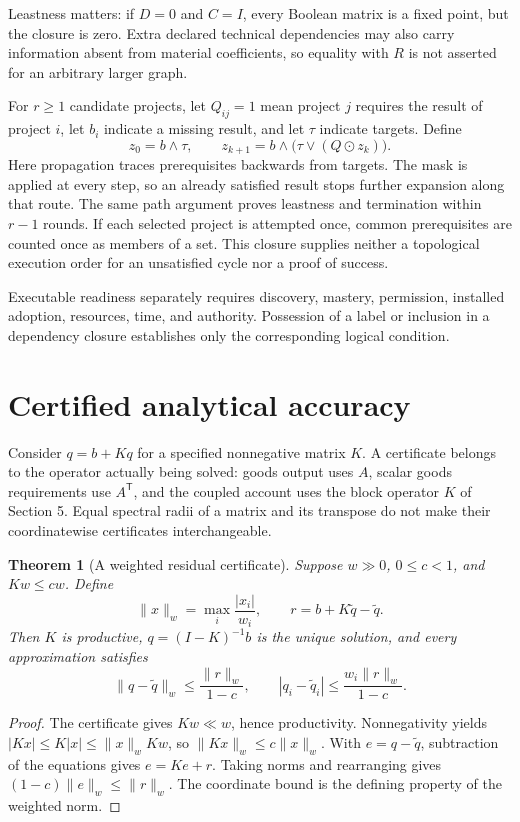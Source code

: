\documentclass[11pt,a4paper]{article}
\newtheorem{theorem}{Theorem}[section]
\begin{document}
Leastness matters: if $D=0$ and $C=I$, every Boolean matrix is a fixed point, but the closure is zero. Extra declared technical dependencies may also carry information absent from material coefficients, so equality with $R$ is not asserted for an arbitrary larger graph.

For $r\geq1$ candidate projects, let $Q_{ij}=1$ mean project $j$ requires the result of project $i$, let $b_i$ indicate a missing result, and let $\tau$ indicate targets. Define
\begin{equation}
z_0=b\wedge\tau,\qquad
z_{k+1}=b\wedge\bigl(\tau\vee(Q\odot z_k)\bigr).
\end{equation}
Here propagation traces prerequisites backwards from targets. The mask is applied at every step, so an already satisfied result stops further expansion along that route. The same path argument proves leastness and termination within $r-1$ rounds. If each selected project is attempted once, common prerequisites are counted once as members of a set. This closure supplies neither a topological execution order for an unsatisfied cycle nor a proof of success.

Executable readiness separately requires discovery, mastery, permission, installed adoption, resources, time, and authority. Possession of a label or inclusion in a dependency closure establishes only the corresponding logical condition.

\section{Certified analytical accuracy}
Consider $q=b+Kq$ for a specified nonnegative matrix $K$. A certificate belongs to the operator actually being solved: goods output uses $A$, scalar goods requirements use $A^{\mathsf T}$, and the coupled account uses the block operator $K$ of Section 5. Equal spectral radii of a matrix and its transpose do not make their coordinatewise certificates interchangeable.

\begin{theorem}[A weighted residual certificate]
Suppose $w\gg0$, $0\leq c<1$, and $Kw\leq cw$. Define
\begin{equation}
\|x\|_w=\max_i\frac{|x_i|}{w_i},\qquad
r=b+K\widetilde q-\widetilde q.
\end{equation}
Then $K$ is productive, $q=(I-K)^{-1}b$ is the unique solution, and every approximation satisfies
\begin{equation}
\|q-\widetilde q\|_w\leq\frac{\|r\|_w}{1-c},
\qquad |q_i-\widetilde q_i|\leq\frac{w_i\|r\|_w}{1-c}.
\end{equation}
\end{theorem}
\begin{proof}
The certificate gives $Kw\ll w$, hence productivity. Nonnegativity yields $|Kx|\leq K|x|\leq\|x\|_w Kw$, so $\|Kx\|_w\leq c\|x\|_w$. With $e=q-\widetilde q$, subtraction of the equations gives $e=Ke+r$. Taking norms and rearranging gives $(1-c)\|e\|_w\leq\|r\|_w$. The coordinate bound is the defining property of the weighted norm.
\end{proof}
\end{document}
